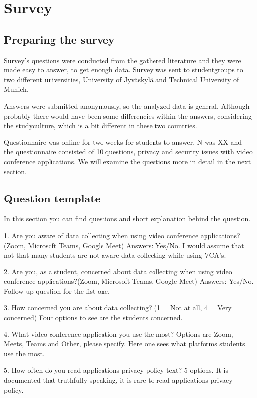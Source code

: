 \documentclass[utf8,english]{gradu3}
\begin{document}
\chapter{Survey}
\label{vca}
\section{Preparing the survey}
Survey's questions were conducted from the gathered literature and they were made easy to answer, to get enough data. Survey was sent to studentgroups to two different universities, University of Jyväskylä and Technical University of Munich. 

Answers were submitted anonymously, so the analyzed data is general. Although probably there would have been some differencies within the answers, considering the studyculture, which is a bit different in these two countries.

Questionnaire was online for two weeks for students to answer. N was XX and the questionnaire consisted of 10 questions, privacy and security issues with video conference applications. We will examine the questions more in detail in the next section.

\section{Question template}
In this section you can find questions and short explanation behind the question.

1. Are you aware of data collecting when using video conference applications?(Zoom, Microsoft Teams, Google Meet) Answers: Yes/No. I would assume that not that many students are not aware data collecting while using VCA's.

2. Are you, as a student, concerned about data collecting when using video conference applications?(Zoom, Microsoft Teams, Google Meet) Answers: Yes/No. Follow-up question for the fist one. 

3. How concerned you are about data collecting? (1 = Not at all, 4 = Very concerned) Four options to see are the students concerned.

4. What video conference application you use the most? Options are Zoom, Meets, Teams and Other, please specify. Here one sees what platforms students use the most. 

5. How often do you read applications privacy policy text? 5 options. It is documented that truthfully speaking, it is rare to read applications privacy policy.
\end{document}
